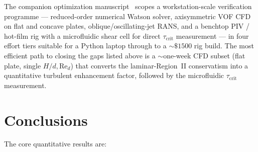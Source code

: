 \documentclass[aps,prfluids,reprint,amsmath,amssymb,floatfix]{revtex4-2}
\newcommand{\Rey}{\mathrm{Re}}
\begin{document}
The companion optimization manuscript~\citep{BurtonOptPaper} scopes a
workstation-scale verification programme --- reduced-order numerical
Watson solver, axisymmetric VOF CFD on flat and concave plates,
oblique/oscillating-jet RANS, and a benchtop PIV / hot-film rig with a
microfluidic shear cell for direct $\tau_\mathrm{crit}$ measurement ---
in four effort tiers suitable for a Python laptop through to a
$\sim$$\$$$1500$ rig build. The most efficient path to closing the gaps
listed above is a $\sim$one-week CFD subset (flat plate, single
$H/d, \Rey_d$) that converts the laminar-Region~II conservatism into a
quantitative turbulent enhancement factor, followed by the microfluidic
$\tau_\mathrm{crit}$ measurement.

\section{Conclusions}
\label{sec:conclusion}

The core quantitative results are:
\end{document}
